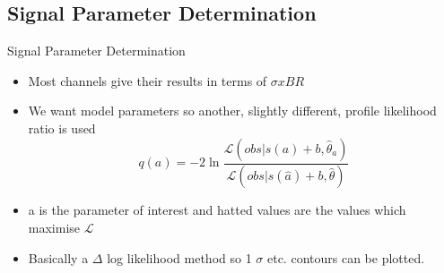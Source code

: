 \documentclass{beamer}
\begin{document}
\subsection{Signal Parameter Determination}
\begin{frame}{Signal Parameter Determination}
  \begin{itemize}
  \item Most channels give their results in terms of $\sigma x BR$
  \item We want model parameters so another, slightly different, profile likelihood ratio is used
    \begin{equation*}
      q(a) = -2\ln\frac{\mathcal{L}(obs|s(a)+b,\hat{\theta}_{a})}{\mathcal{L}(obs|s(\hat{a})+b,\hat{\theta})}
    \end{equation*}
  \item a is the parameter of interest and hatted values are the values which maximise $\mathcal{L}$
  \item Basically a $\Delta$ log likelihood method so 1 $\sigma$ etc. contours can be plotted.
  \end{itemize}
\end{frame}
\end{document}
